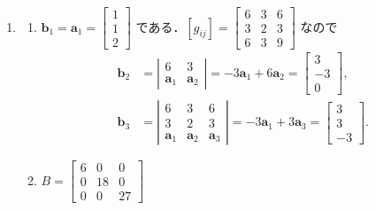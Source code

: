 \documentclass[11pt, uplatex, dvipdfmx]{jsarticle}
\begin{document}
\begin{enumerate}
  
\item
  \begin{enumerate}[(1)]
    \setlength{\itemsep}{1ex}
    
  \item $\bm{b}_1= \bm{a}_1=\left[
      \begin{array}{r}
        1\\
        1\\
        2
      \end{array}
      \right]$ である．$\left[ g_{ij} \right] = \left[
      \begin{array}{ccc}
        6 & 3 & 6\\
        3 & 2 & 3\\
        6 & 3 & 9
      \end{array}
    \right]$ なので
    \[
      \begin{aligned}
        \bm{b}_2 &= \left|
                   \begin{array}{cc}
                     6 & 3\\
                     \bm{a}_1 & \bm{a}_2
                   \end{array}
                   \right| = -3\bm{a}_1 + 6\bm{a}_2 = \left[
                   \begin{array}{r}
                     3\\
                     -3\\
                     0
                   \end{array}
                   \right],\\
        \bm{b}_3 &= \left|
                   \begin{array}{ccc}
                     6 & 3 & 6\\
                     3 & 2 & 3\\
                     \bm{a}_1 & \bm{a}_2 & \bm{a}_3
                   \end{array}
                   \right| = -3\bm{a}_1 + 3\bm{a}_3 = \left[
                   \begin{array}{r}
                     3\\
                     3\\
                     -3
                   \end{array}
                   \right].
      \end{aligned}
    \]
      
    \item $B=\left[
        \begin{array}{rrr}
          6 & 0 & 0\\
          0 & 18 & 0\\
          0 & 0 & 27
        \end{array}
      \right]$
  \end{enumerate}
\end{enumerate}
\end{document}
